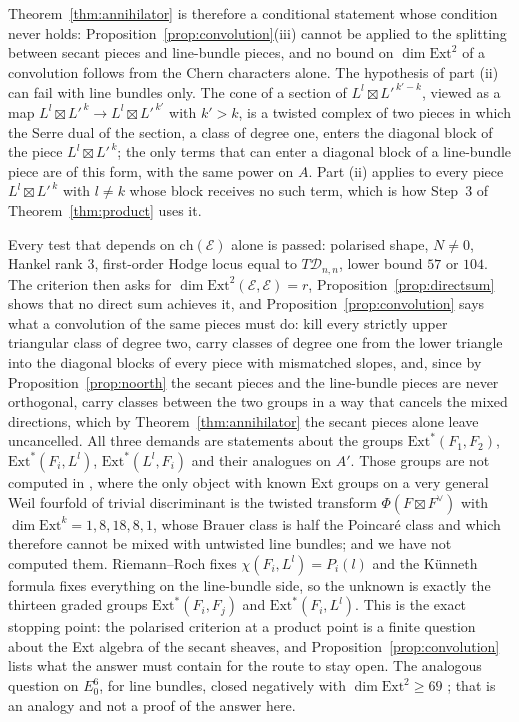 \documentclass[11pt,reqno]{amsart}
\makeatletter
\renewcommand\subsection{\@startsection{subsection}{2}\z@{.6\linespacing\@plus.7\linespacing}{.3\linespacing}{\normalfont\bfseries}}
\numberwithin{equation}{section}
\theoremstyle{plain}
\theoremstyle{definition}
\newcommand{\Ext}{\mathrm{Ext}}
\newcommand{\ch}{\mathrm{ch}}
\newcommand{\cD}{\mathcal{D}}
\makeatother
\begin{document}
Theorem~\ref{thm:annihilator} is therefore a conditional statement whose condition never holds: Proposition~\ref{prop:convolution}(iii) cannot be applied to the splitting between secant pieces and line-bundle pieces, and no bound on $\dim\Ext^{2}$ of a convolution follows from the Chern characters alone. The hypothesis of part (ii) can fail with line bundles only. The cone of a section of $L^{l}\boxtimes L'^{\,k'-k}$, viewed as a map $L^{l}\boxtimes L'^{\,k}\to L^{l}\boxtimes L'^{\,k'}$ with $k'>k$, is a twisted complex of two pieces in which the Serre dual of the section, a class of degree one, enters the diagonal block of the piece $L^{l}\boxtimes L'^{\,k}$; the only terms that can enter a diagonal block of a line-bundle piece are of this form, with the same power on $A$. Part (ii) applies to every piece $L^{l}\boxtimes L'^{\,k}$ with $l\ne k$ whose block receives no such term, which is how Step~3 of Theorem~\ref{thm:product} uses it.

\subsection{Where the product object stops}\label{ssec:f2stop1}

Every test that depends on $\ch(\mathcal{E})$ alone is passed: polarised shape, $N\ne0$, Hankel rank $3$, first-order Hodge locus equal to $T\cD_{n,n}$, lower bound $57$ or $104$. The criterion then asks for $\dim\Ext^{2}(\mathcal{E},\mathcal{E})=r$, Proposition~\ref{prop:directsum} shows that no direct sum achieves it, and Proposition~\ref{prop:convolution} says what a convolution of the same pieces must do: kill every strictly upper triangular class of degree two, carry classes of degree one from the lower triangle into the diagonal blocks of every piece with mismatched slopes, and, since by Proposition~\ref{prop:noorth} the secant pieces and the line-bundle pieces are never orthogonal, carry classes between the two groups in a way that cancels the mixed directions, which by Theorem~\ref{thm:annihilator} the secant pieces alone leave uncancelled. All three demands are statements about the groups $\Ext^{*}(F_{1},F_{2})$, $\Ext^{*}(F_{i},L^{l})$, $\Ext^{*}(L^{l},F_{i})$ and their analogues on $A'$. Those groups are not computed in \cite{Mar25a,Mar25b,Mar25c}, where the only object with known Ext groups on a very general Weil fourfold of trivial discriminant is the twisted transform $\Phi(F\boxtimes F^{\vee})$ with $\dim\Ext^{k}=1,8,18,8,1$, whose Brauer class is half the Poincar\'e class and which therefore cannot be mixed with untwisted line bundles; and we have not computed them. Riemann--Roch fixes $\chi(F_{i},L^{l})=P_{i}(l)$ and the K\"unneth formula fixes everything on the line-bundle side, so the unknown is exactly the thirteen graded groups $\Ext^{*}(F_{i},F_{j})$ and $\Ext^{*}(F_{i},L^{l})$. This is the exact stopping point: the polarised criterion at a product point is a finite question about the Ext algebra of the secant sheaves, and Proposition~\ref{prop:convolution} lists what the answer must contain for the route to stay open. The analogous question on $E_{0}^{6}$, for line bundles, closed negatively with $\dim\Ext^{2}\ge69$ \cite[Thm.~18.35]{BMB26}; that is an analogy and not a proof of the answer here.
\end{document}
